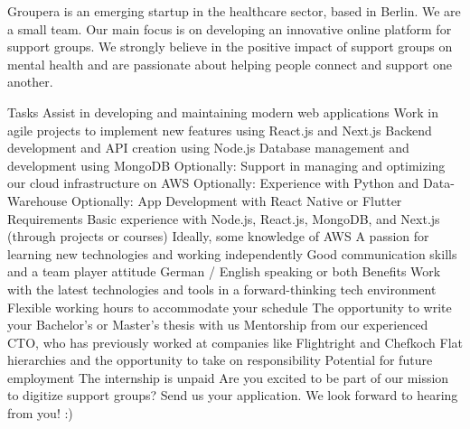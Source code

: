Groupera is an emerging startup in the healthcare sector, based in Berlin. We are a small team. Our main focus is on developing an innovative online platform for support groups. We strongly believe in the positive impact of support groups on mental health and are passionate about helping people connect and support one another.

Tasks
Assist in developing and maintaining modern web applications
Work in agile projects to implement new features using React.js and Next.js
Backend development and API creation using Node.js
Database management and development using MongoDB
Optionally: Support in managing and optimizing our cloud infrastructure on AWS
Optionally: Experience with Python and Data-Warehouse
Optionally: App Development with React Native or Flutter
Requirements
Basic experience with Node.js, React.js, MongoDB, and Next.js (through projects or courses)
Ideally, some knowledge of AWS
A passion for learning new technologies and working independently
Good communication skills and a team player attitude
German / English speaking or both
Benefits
Work with the latest technologies and tools in a forward-thinking tech environment
Flexible working hours to accommodate your schedule
The opportunity to write your Bachelor's or Master's thesis with us
Mentorship from our experienced CTO, who has previously worked at companies like Flightright and Chefkoch
Flat hierarchies and the opportunity to take on responsibility
Potential for future employment
The internship is unpaid
Are you excited to be part of our mission to digitize support groups? Send us your application. We look forward to hearing from you! :)